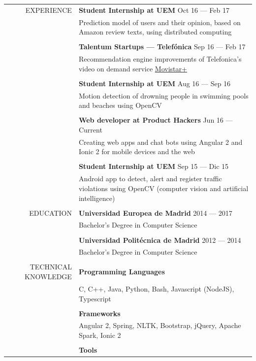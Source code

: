 \documentclass[a4paper, 11pt]{article}
\begin{document}
\begin{longtable}{rp{11cm}}
    EXPERIENCE
    & {\bf Student Internship at UEM} \hfill Oct 16 --- Feb 17\\
    & Prediction model of users and their opinion, based on Amazon review texts, using distributed computing\\
    \\
    & {\bf Talentum Startups --- Telefónica} \hfill Sep 16 --- Feb 17\\
    & Recommendation engine improvements of Telefonica's video on demand service \href{http://ver.movistarplus.es/}{Movistar+}\\
    \\
    & {\bf Student Internship at UEM} \hfill Aug 16 --- Sep 16\\
    & Motion detection of drowning people in swimming pools and beaches using OpenCV\\
    \\
    & {\bf Web developer at Product Hackers} \hfill Jun 16 --- Current\\
    & Creating web apps and chat bots using Angular 2 and Ionic 2 for mobile devices and the web\\
    \\
    & {\bf Student Internship at UEM} \hfill Sep 15 --- Dic 15\\
    & Android app to detect, alert and register traffic violations using OpenCV (computer vision and artificial intelligence)\\
    \\
    EDUCATION
    & {\bf Universidad Europea de Madrid} \hfill 2014 --- 2017\\
    & Bachelor's Degree in Computer Science\\
    \\
    & {\bf Universidad Politécnica de Madrid} \hfill 2012 --- 2014\\
    & Bachelor's Degree in Computer Science\\ 
    \\
    TECHNICAL KNOWLEDGE
    & {\bf Programming Languages}\\
    & C, C++, Java, Python, Bash, Javascript (NodeJS), Typescript\\
    \\
    & {\bf Frameworks}\\
    & Angular 2, Spring, NLTK, Bootstrap, jQuery, Apache Spark, Ionic 2\\
    \\
    & {\bf Tools}\\

\end{longtable}
\end{document}
